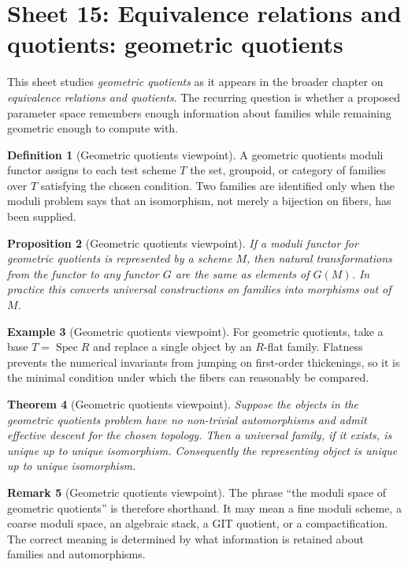 \documentclass[11pt]{amsart}
\newtheorem{theorem}{Theorem}[section]
\newtheorem{proposition}[theorem]{Proposition}
\theoremstyle{definition}
\newtheorem{definition}[theorem]{Definition}
\newtheorem{example}[theorem]{Example}
\newtheorem{remark}[theorem]{Remark}
\newcommand{\Spec}{\operatorname{Spec}}
\begin{document}
\section{Sheet 15: Equivalence relations and quotients: geometric quotients}
This sheet studies \emph{geometric quotients} as it appears in the broader chapter on \emph{equivalence relations and quotients}.  The recurring question is whether a proposed parameter space remembers enough information about families while remaining geometric enough to compute with.
\begin{definition}[Geometric quotients viewpoint]
A geometric quotients moduli functor assigns to each test scheme $T$ the set, groupoid, or category of families over $T$ satisfying the chosen condition.  Two families are identified only when the moduli problem says that an isomorphism, not merely a bijection on fibers, has been supplied.
\end{definition}
\begin{proposition}[Geometric quotients viewpoint]
If a moduli functor for geometric quotients is represented by a scheme $M$, then natural transformations from the functor to any functor $G$ are the same as elements of $G(M)$.  In practice this converts universal constructions on families into morphisms out of $M$.
\end{proposition}
\begin{example}[Geometric quotients viewpoint]
For geometric quotients, take a base $T=\Spec R$ and replace a single object by an $R$-flat family.  Flatness prevents the numerical invariants from jumping on first-order thickenings, so it is the minimal condition under which the fibers can reasonably be compared.
\end{example}
\begin{theorem}[Geometric quotients viewpoint]
Suppose the objects in the geometric quotients problem have no non-trivial automorphisms and admit effective descent for the chosen topology.  Then a universal family, if it exists, is unique up to unique isomorphism.  Consequently the representing object is unique up to unique isomorphism.
\end{theorem}
\begin{remark}[Geometric quotients viewpoint]
The phrase ``the moduli space of geometric quotients'' is therefore shorthand.  It may mean a fine moduli scheme, a coarse moduli space, an algebraic stack, a GIT quotient, or a compactification.  The correct meaning is determined by what information is retained about families and automorphisms.
\end{remark}
\end{document}
